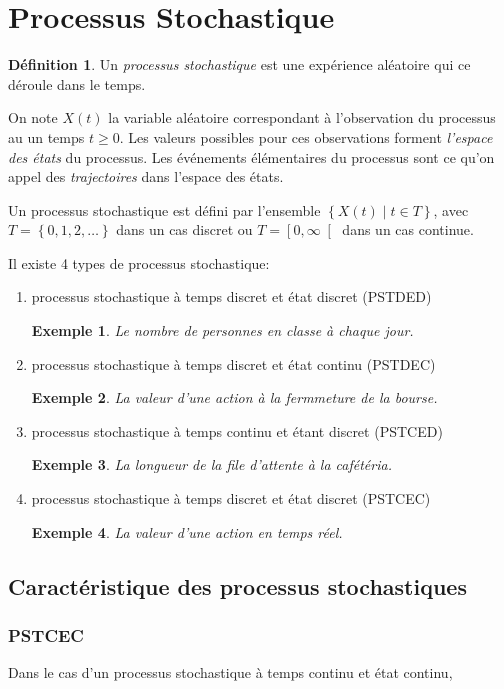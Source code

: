 \documentclass[11pt]{article}
\makeatletter
\newtheorem*{exemple*}{Exemple}
\theoremstyle{remark}
\theoremstyle{definition}
\newtheorem*{@definition}{Définition}
\newenvironment{definition}{%
	\begin{@definition}%
}{%
	\end{@definition}%
	\setcounter{property}{0}%
}
\makeatother
\begin{document}
\section{Processus Stochastique}
\begin{definition}
	Un \textit{processus stochastique} est une expérience aléatoire qui ce
	déroule dans le temps.
\end{definition}

On note $X(t)$ la variable aléatoire correspondant à l'observation du processus
au un temps $t\geq 0$. Les valeurs possibles pour ces observations forment
\textit{l'espace des états} du processus. Les événements élémentaires du
processus sont ce qu'on appel des \textit{trajectoires} dans l'espace des
états.

Un processus stochastique est défini par l'ensemble $\left\{X(t)\middle\rvert
t\in T\right\}$, avec $T=\left\{0,1,2,\dots\right\}$ dans un cas discret ou
$T=\left[0,\infty\right[$ dans un cas continue.

Il existe 4 types de processus stochastique:
\begin{enumerate}
	\item processus stochastique à temps discret et état discret (PSTDED)
	\begin{exemple*}
		Le nombre de personnes en classe à chaque jour.
	\end{exemple*}
	\item processus stochastique à temps discret et état continu (PSTDEC)
	\begin{exemple*}
		La valeur d'une action à la fermmeture de la bourse.
	\end{exemple*}
	\item processus stochastique à temps continu et étant discret (PSTCED)
	\begin{exemple*}
		La longueur de la file d'attente à la cafétéria.
	\end{exemple*}
	\item processus stochastique à temps discret et état discret (PSTCEC)
	\begin{exemple*}
		La valeur d'une action en temps réel.
	\end{exemple*}
\end{enumerate}

\subsection{Caractéristique des processus stochastiques}
\subsubsection{PSTCEC}
Dans le cas d'un processus stochastique à temps continu et état continu, 
\end{document}
